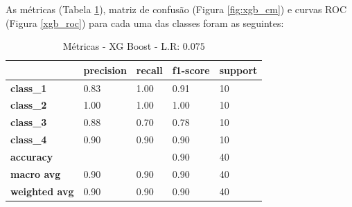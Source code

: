 \documentclass[
	article,			%
	11pt,				%
	oneside,			%
	a4paper,			%
	english,			%
	brazil,				%
	sumario=tradicional
	]{abntex2}
\begin{document}
As métricas (Tabela \ref{tab:xgb_01}), matriz de confusão (Figura \ref{fig:xgb_cm}) e curvas ROC (Figura \ref{xgb_roc}) para cada uma das classes foram as seguintes:

\begin{table}[]
\centering
\begin{tabular}{l|l|l|l|l|}
\cline{2-5}
                                            & \textbf{precision} & \textbf{recall} & \textbf{f1-score} & \textbf{support} \\ \hline
\multicolumn{1}{|l|}{\textbf{class\_1}}     & 0.83               & 1.00            & 0.91              & 10               \\ \hline
\multicolumn{1}{|l|}{\textbf{class\_2}}     & 1.00               & 1.00            & 1.00              & 10               \\ \hline
\multicolumn{1}{|l|}{\textbf{class\_3}}     & 0.88               & 0.70            & 0.78              & 10               \\ \hline
\multicolumn{1}{|l|}{\textbf{class\_4}}     & 0.90               & 0.90            & 0.90              & 10               \\ \hline
\multicolumn{1}{|l|}{\textbf{accuracy}}     &                    &                 & 0.90              & 40               \\ \hline
\multicolumn{1}{|l|}{\textbf{macro avg}}    & 0.90               & 0.90            & 0.90              & 40               \\ \hline
\multicolumn{1}{|l|}{\textbf{weighted avg}} & 0.90               & 0.90            & 0.90              & 40               \\ \hline
\end{tabular}
\caption{Métricas - XG Boost - L.R: $0.075$}
\label{tab:xgb_01}
\end{table}
\end{document}

